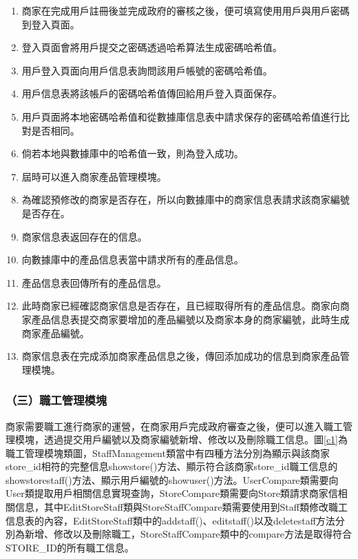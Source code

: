 	\begin{enumerate}
	\item 商家在完成用戶註冊後並完成政府的審核之後，便可填寫使用用戶與用戶密碼到登入頁面。
	\item 登入頁面會將用戶提交之密碼透過哈希算法生成密碼哈希值。
	\item 用戶登入頁面向用戶信息表詢問該用戶帳號的密碼哈希值。
	\item 用戶信息表將該帳戶的密碼哈希值傳回給用戶登入頁面保存。
	\item 用戶頁面將本地密碼哈希值和從數據庫信息表中請求保存的密碼哈希值進行比對是否相同。
	\item 倘若本地與數據庫中的哈希值一致，則為登入成功。
	\item 屆時可以進入商家產品管理模塊。
	\item 為確認預修改的商家是否存在，所以向數據庫中的商家信息表請求該商家編號是否存在。
	\item 商家信息表返回存在的信息。
	\item 向數據庫中的產品信息表當中請求所有的產品信息。
	\item 產品信息表回傳所有的產品信息。
	\item 此時商家已經確認商家信息是否存在，且已經取得所有的產品信息。商家向商家產品信息表提交商家要增加的產品編號以及商家本身的商家編號，此時生成商家產品編號。
	\item 商家信息表在完成添加商家產品信息之後，傳回添加成功的信息到商家產品管理模塊。
	\end{enumerate}


\subsubsection{（三）職工管理模塊}
商家需要職工進行商家的運營，在商家用戶完成政府審查之後，便可以進入職工管理模塊，透過提交用戶編號以及商家編號新增、修改以及刪除職工信息。圖\ref{c1}為職工管理模塊類圖，StaffManagement類當中有四種方法分別為顯示與該商家store\_id相符的完整信息showstore()方法、顯示符合該商家store\_id職工信息的showstorestaff()方法、顯示用戶編號的showuser()方法。UserCompare類需要向User類提取用戶相關信息實現查詢，StoreCompare類需要向Store類請求商家信相關信息，其中EditStoreStaff類與StoreStaffCompare類需要使用到Staff類修改職工信息表的內容，EditStoreStaff類中的addstaff()、editstaff()以及deletestaff方法分別為新增、修改以及刪除職工，StoreStaffCompare類中的compare方法是取得符合STORE\_ID的所有職工信息。

